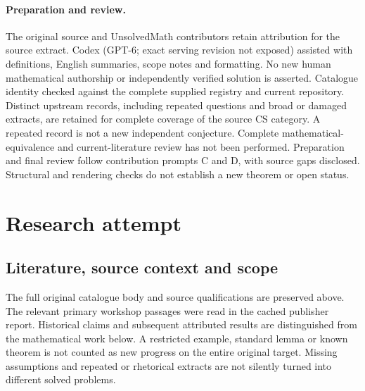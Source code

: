 \documentclass[11pt]{article}
\begin{document}
\paragraph{Preparation and review.}
The original source and UnsolvedMath contributors retain attribution for the source extract. Codex (GPT-6; exact serving revision not exposed) assisted with definitions, English summaries, scope notes and formatting. No new human mathematical authorship or independently verified solution is asserted. Catalogue identity checked against the complete supplied registry and current repository. Distinct upstream records, including repeated questions and broad or damaged extracts, are retained for complete coverage of the source CS category. A repeated record is not a new independent conjecture. Complete mathematical-equivalence and current-literature review has not been performed. Preparation and final review follow contribution prompts C and D, with source gaps disclosed. Structural and rendering checks do not establish a new theorem or open status.
\label{end:statement}

\section{Research attempt}
\subsection{Literature, source context and scope}
The full original catalogue body and source qualifications are preserved above. The relevant primary workshop passages were read in the cached publisher report. Historical claims and subsequent attributed results are distinguished from the mathematical work below. A restricted example, standard lemma or known theorem is not counted as new progress on the entire original target. Missing assumptions and repeated or rhetorical extracts are not silently turned into different solved problems.
\end{document}
